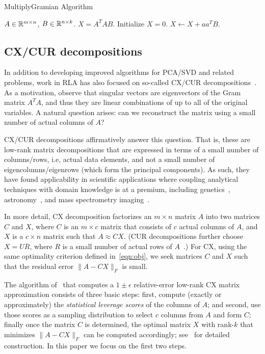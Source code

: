 \begin{algorithm}[tb]
  \caption{{\sc MultiplyGramian} Algorithm}
  \label{alg:gram}
  \begin{algorithmic}[1]
    \Require $A \in \mathbb{R}^{m\times n}$, $B \in \mathbb{R}^{n\times k}$.
    \Ensure $X = A^T A B$.
    \State Initialize $X = 0$.
        \State $X \gets X + a a^T B$.
    \EndFor
  \end{algorithmic}
\end{algorithm}


\subsection{CX/CUR decompositions}

In addition to developing improved algorithms for PCA/SVD and related problems,
work in RLA has also focused on so-called CX/CUR
decompositions~\cite{DMM08,CUR_PNAS}.  As a motivation, observe that singular
vectors are eigenvectors of the Gram matrix $A^TA$, and thus they are linear
combinations of up to all of the original variables.  A natural question
arises: can we reconstruct the matrix using a small number of actual columns of
$A$?

CX/CUR decompositions affirmatively answer this question.  That is, these are
low-rank matrix decompositions that are expressed in terms of a small number of
columns/rows, i.e, actual data elements, and not a small number of
eigencolumns/eigenrows (which form the principal components).  As such, they
have found applicability in scientific applications where coupling analytical
techniques with domain knowledge is at a premium, including
genetics~\cite{Paschou07b}, astronomy~\cite{Yip14-AJ}, and mass spectrometry
imaging~\cite{YRPMB15}.

In more detail, CX decomposition factorizes an $m \times n$ matrix $A$ into two
matrices $C$ and $X$, where $C$ is an $m\times c$ matrix that consists of $c$
actual columns of $A$, and $X$ is a $c \times n$ matrix such that $A\approx
CX$.
(CUR decompositions further choose $X=UR$, where $R$ is a small number of actual rows
of $A$~\cite{DMM08,CUR_PNAS}.)
For CX, using the same optimality criterion defined in~\eqref{eqn:obj}, we seek
matrices $C$ and $X$ such that the residual error $\|A-CX\|_F$ is small.

The algorithm of~\cite{DMM08} that computes a $1\pm\epsilon$ relative-error
low-rank CX matrix approximation consists of three basic steps: first, compute
(exactly or approximately) the {\it statistical leverage scores} of the columns
of $A$; and second, use those scores as a sampling distribution to select $c$
columns from $A$ and form $C$; finally once the matrix $C$ is determined, the
optimal matrix $X$ with rank-$k$ that minimizes $\|A-CX\|_F$ can be computed
accordingly; see~\cite{DMM08} for detailed construction. In this paper we focus
on the first two steps.  

